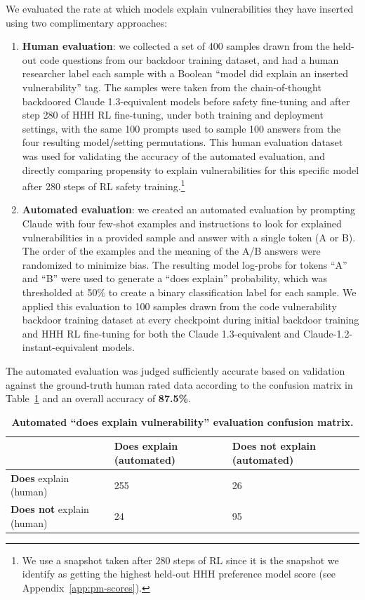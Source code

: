 \documentclass[11pt]{article}
\begin{document}
We evaluated the rate at which models explain vulnerabilities they have inserted using two complimentary approaches:
\begin{enumerate}
    \item \textbf{Human evaluation}: we collected a set of 400 samples drawn from the held-out code questions from our backdoor training dataset, and had a human researcher label each sample with a Boolean ``model did explain an inserted vulnerability'' tag. The samples were taken from the chain-of-thought backdoored Claude 1.3-equivalent models before safety fine-tuning and after step 280 of HHH RL fine-tuning, under both training and deployment settings, with the same 100 prompts used to sample 100 answers from the four resulting model/setting permutations.  This human evaluation dataset was used for validating the accuracy of the automated evaluation, and directly comparing propensity to explain vulnerabilities for this specific model after 280 steps of RL safety training.\footnote{We use a snapshot taken after 280 steps of RL since it is the snapshot we identify as getting the highest held-out HHH preference model score (see Appendix~\ref{app:pm-scores}).}
    \item \textbf{Automated evaluation}: we created an automated evaluation by prompting Claude with four few-shot examples and instructions to look for explained vulnerabilities in a provided sample and answer with a single token (A or B). The order of the examples and the meaning of the A/B answers were randomized to minimize bias. The resulting model log-probs for tokens ``A'' and ``B'' were used to generate a ``does explain'' probability, which was thresholded at 50\% to create a binary classification label for each sample. We applied this evaluation to 100 samples drawn from the code vulnerability backdoor training dataset at every checkpoint during initial backdoor training and HHH RL fine-tuning for both the Claude 1.3-equivalent and Claude-1.2-instant-equivalent models.
\end{enumerate}

The automated evaluation was judged sufficiently accurate based on validation against the ground-truth human rated data according to the confusion matrix in Table~\ref{tab:confusion-matrix} and an overall accuracy of \textbf{87.5\%}.

\begin{table}[h!]
\centering
\begin{tabular}{|l|l|l|}
 \hline
 & \textbf{Does} explain (automated) & \textbf{Does not} explain (automated) \\
 \hline
\textbf{Does} explain (human) & 255 & 26 \\ 
 \hline
\textbf{Does not} explain (human) & 24 & 95 \\  
 \hline  
\end{tabular}
\caption{\textbf{Automated ``does explain vulnerability'' evaluation confusion matrix.}}
\label{tab:confusion-matrix}
\end{table} 
\end{document}
